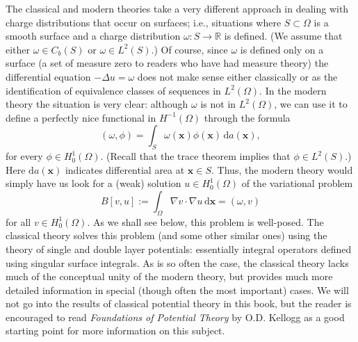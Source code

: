 \begin{Example}
The classical and modern theories take a very different approach in dealing with charge distributions that occur on surfaces; i.e., situations where $S\subset\Omega$ is a smooth surface and a charge distribution $\omega:S\to\mathbb{R}$ is defined. (We assume that either $\omega\in C_b(S)$ or $\omega\in L^2(S)$.) Of course, since $\omega$ is defined only on a surface (a set of measure zero to readers who have had measure theory) the differential equation $-\Delta u=\omega$ does not make sense either classically or as the identification of equivalence classes of sequences in $L^2(\Omega)$. In the modern theory the situation is very clear: although $\omega$ is not in $L^2(\Omega)$, we can use it to define a perfectly nice functional in $H^{-1}(\Omega)$ through the formula
\begin{equation}\label{eq:surface-charge-negative-sobolev-functional}
(\omega,\phi)=\int_S\omega(\bm{x})\phi(\bm{x})\,\mathrm{d}a(\bm{x}),
\end{equation}
for every $\phi\in H_0^1(\Omega)$. (Recall that the trace theorem implies that $\phi\in L^2(S)$.) Here $\mathrm{d}a(\bm{x})$ indicates differential area at $\bm{x}\in S$. Thus, the modern theory would simply have us look for a (weak) solution $u\in H_0^1(\Omega)$ of the variational problem
\begin{equation}\label{eq:surface-charge-electrostatic-variational-problem}
B[v,u]:=\int_\Omega\nabla v\cdot\nabla u\,\mathrm{d}\bm{x}=(\omega,v)
\end{equation}
for all $v\in H_0^1(\Omega)$. As we shall see below, this problem is well-posed. The classical theory solves this problem (and some other similar ones) using the theory of single and double layer potentials: essentially integral operators defined using singular surface integrals. As is so often the case, the classical theory lacks much of the conceptual unity of the modern theory, but provides much more detailed information in special (though often the most important) cases. We will not go into the results of classical potential theory in this book, but the reader is encouraged to read \emph{Foundations of Potential Theory} by O.D. Kellogg \cite{Ke} as a good starting point for more information on this subject.
\end{Example}
